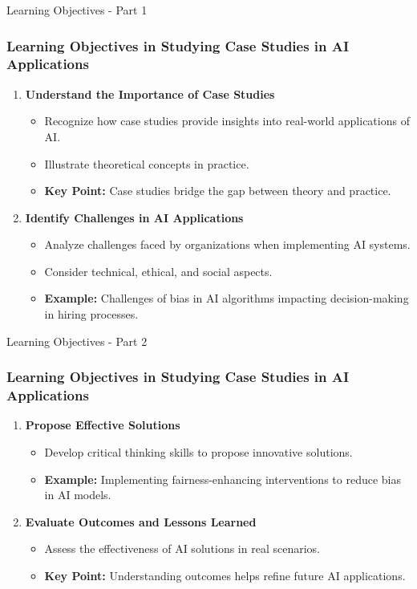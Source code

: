\documentclass[aspectratio=169]{beamer}
\begin{document}
\begin{frame}[fragile]{Learning Objectives - Part 1}
    \frametitle{Learning Objectives in Studying Case Studies in AI Applications}
    
    \begin{enumerate}
        \item \textbf{Understand the Importance of Case Studies}
        \begin{itemize}
            \item Recognize how case studies provide insights into real-world applications of AI.
            \item Illustrate theoretical concepts in practice.
            \item \textbf{Key Point:} Case studies bridge the gap between theory and practice.
        \end{itemize}
        
        \item \textbf{Identify Challenges in AI Applications}
        \begin{itemize}
            \item Analyze challenges faced by organizations when implementing AI systems.
            \item Consider technical, ethical, and social aspects.
            \item \textbf{Example:} Challenges of bias in AI algorithms impacting decision-making in hiring processes.
        \end{itemize}
    \end{enumerate}
\end{frame}

\begin{frame}[fragile]{Learning Objectives - Part 2}
    \frametitle{Learning Objectives in Studying Case Studies in AI Applications}
    
    \begin{enumerate}[resume]
        \item \textbf{Propose Effective Solutions}
        \begin{itemize}
            \item Develop critical thinking skills to propose innovative solutions.
            \item \textbf{Example:} Implementing fairness-enhancing interventions to reduce bias in AI models.
        \end{itemize}
        
        \item \textbf{Evaluate Outcomes and Lessons Learned}
        \begin{itemize}
            \item Assess the effectiveness of AI solutions in real scenarios.
            \item \textbf{Key Point:} Understanding outcomes helps refine future AI applications.
        \end{itemize}
    \end{enumerate}
\end{frame}
\end{document}
